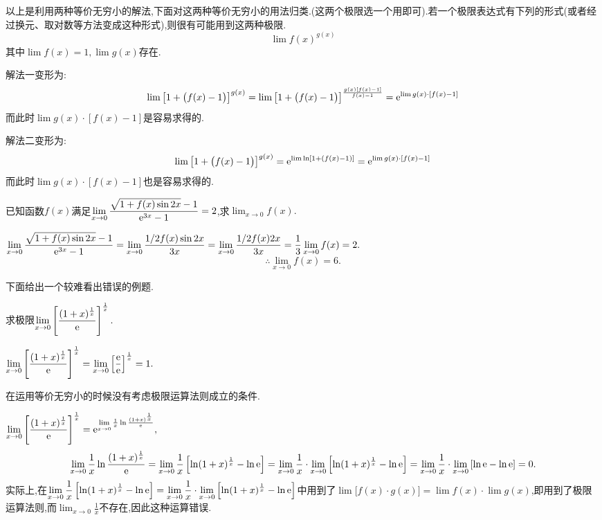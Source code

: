 \inference[等价无穷小类型\uppercase\expandafter{\romannumeral1}]
以上是利用两种等价无穷小的解法,下面对这两种等价无穷小的用法归类.(这两个极限选一个用即可).若一个极限表达式有下列的形式(或者经过换元、取对数等方法变成这种形式),则很有可能用到这两种极限.
\begin{equation}
\lim f(x)^{g(x)}
\end{equation}
其中$\lim f(x)=1,\lim g(x)$存在.

解法一\qquad 变形为:
\begin{equation}
	\lim\big[1+\big(f(x)-1\big)\big]^{g(x)}=\lim\big[1+\big(f(x)-1\big)\big]^{\frac{g(x)[f(x)-1]}{f(x)-1}}={\rm{e}}^{\lim g(x)\cdot [f(x)-1]}
\end{equation}
而此时$\lim g(x) \cdot [f(x)-1]$是容易求得的.


解法二\qquad 变形为:
\begin{equation}
\lim\big[1+\big(f(x)-1\big)\big]^{g(x)}={\rm{e}}^{\lim \ln[1+\left( f(x)-1\right) ]}={\rm{e}}^{\lim g(x)\cdot [f(x)-1]}
\end{equation}
而此时$\lim g(x) \cdot [f(x)-1]$也是容易求得的.

\examples 已知函数$f(x)$满足$\displaystyle \lim_{x \to 0}\frac{\sqrt{1+f(x)\sin 2x}-1}{{\rm{e}}^{3x}-1}=2$,求$\displaystyle \lim_{x \to 0}f(x).$

\solve $\displaystyle \lim_{x \to 0}\frac{\sqrt{1+f(x)\sin 2x}-1}{{\rm{e}}^{3x}-1}=\lim\limits_{x \to 0}\frac{1/2f(x)\sin 2x}{3x}=\lim_{x \to 0}\frac{1/2f(x)2x}{3x}=\frac{1}{3}\lim_{x\to 0}f(x)=2.$
\[
\therefore \lim_{x \to 0}f(x)=6.
\]

下面给出一个较难看出错误的例题.

\examples \label{例 1.12}求极限$\displaystyle \lim_{x \to 0}\left[ \frac{(1+x)^{\frac{1}{x}}}{{\rm{e}}}\right]^{\frac{1}{x}}.$

\errsolve $\displaystyle \lim_{x \to 0}\left[ \frac{(1+x)^{\frac{1}{x}}}{{\rm{e}}}\right]^{\frac{1}{x}}=\lim_{x \to 0}\left[ \frac{{\rm{e}}}{{\rm{e}}}\right]^{\frac{1}{x}}=1.$

\errreason 在运用等价无穷小的时候没有考虑极限运算法则成立的条件.

\solvereason $\displaystyle \lim_{x \to 0}\left[ \frac{(1+x)^{\frac{1}{x}}}{{\rm{e}}}\right]^{\frac{1}{x}}={\rm{e}}^{\lim\limits_{x \to 0}\frac{1}{x}\ln\frac{(1+x)^{\frac{1}{x}}}{{\rm{e}}}},$
\[
\lim_{x \to 0}\frac{1}{x}\ln\frac{(1+x)^{\frac{1}{x}}}{{\rm{e}}}=\lim\limits_{x \to 0}\frac{1}{x}\left[ \ln(1+x)^{\frac{1}{x}} -\ln {\rm{e}}\right]=\lim\limits_{x \to 0}\frac{1}{x}\cdot\lim\limits_{x \to 0}\left[ \ln(1+x)^{\frac{1}{x}} -\ln {\rm{e}}\right]=\lim_{x \to 0}\frac{1}{x} \cdot \lim\limits_{x \to 0} \left[ \ln {\rm{e}} -\ln {\rm{e}} \right]=0.
\]
实际上,在$\displaystyle \lim\limits_{x \to 0}\frac{1}{x}\left[ \ln(1+x)^{\frac{1}{x}}-\ln {\rm{e}} \right]=\lim\limits_{x \to 0}\frac{1}{x}\cdot\lim\limits_{x \to 0}\left[ \ln(1+x)^{\frac{1}{x}} -\ln {\rm{e}}\right]$中用到了$\lim \big[f(x)\cdot g(x)\big]=\lim f(x) \cdot \lim  g(x)$,即用到了极限运算法则,而$\displaystyle \lim_{x \to 0}\frac{1}{x}$不存在,因此这种运算错误.

